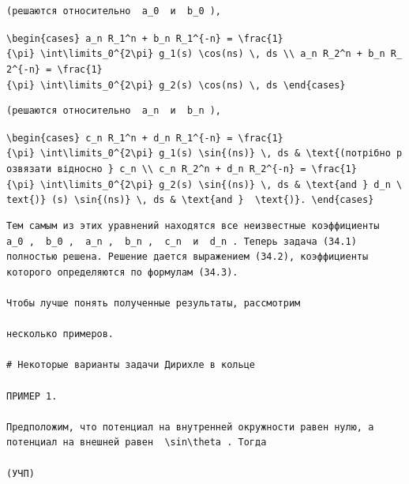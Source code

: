 \documentclass[
  ukrainian,
]{article}
\begin{document}
\begin{verbatim}
(решаются относительно  a_0  и  b_0 ),
\end{verbatim}

\texttt{\textbackslash{}begin\{cases\}\ a\_n\ R\_1\^{}n\ +\ b\_n\ R\_1\^{}\{-n\}\ =\ \textbackslash{}frac\{1\}\{\textbackslash{}pi\}\ \textbackslash{}int\textbackslash{}limits\_0\^{}\{2\textbackslash{}pi\}\ g\_1(s)\ \textbackslash{}cos(ns)\ \textbackslash{},\ ds\ \textbackslash{}\textbackslash{}\ a\_n\ R\_2\^{}n\ +\ b\_n\ R\_2\^{}\{-n\}\ =\ \textbackslash{}frac\{1\}\{\textbackslash{}pi\}\ \textbackslash{}int\textbackslash{}limits\_0\^{}\{2\textbackslash{}pi\}\ g\_2(s)\ \textbackslash{}cos(ns)\ \textbackslash{},\ ds\ \textbackslash{}end\{cases\}}

\begin{verbatim}
(решаются относительно  a_n  и  b_n ),
\end{verbatim}

\texttt{\textbackslash{}begin\{cases\}\ c\_n\ R\_1\^{}n\ +\ d\_n\ R\_1\^{}\{-n\}\ =\ \textbackslash{}frac\{1\}\{\textbackslash{}pi\}\ \textbackslash{}int\textbackslash{}limits\_0\^{}\{2\textbackslash{}pi\}\ g\_1(s)\ \textbackslash{}sin\{(ns)\}\ \textbackslash{},\ ds\ \&\ \textbackslash{}text\{(потрібно\ розв\textquotesingle{}язати\ відносно\ \}\ c\_n\ \textbackslash{}\textbackslash{}\ c\_n\ R\_2\^{}n\ +\ d\_n\ R\_2\^{}\{-n\}\ =\ \textbackslash{}frac\{1\}\{\textbackslash{}pi\}\ \textbackslash{}int\textbackslash{}limits\_0\^{}\{2\textbackslash{}pi\}\ g\_2(s)\ \textbackslash{}sin\{(ns)\}\ \textbackslash{},\ ds\ \&\ \textbackslash{}text\{and\ \}\ d\_n\ \textbackslash{}text\{)\}\ (s)\ \textbackslash{}sin\{(ns)\}\ \textbackslash{},\ ds\ \&\ \textbackslash{}text\{and\ \}\ \ \textbackslash{}text\{)\}.\ \textbackslash{}end\{cases\}}

\begin{verbatim}
Тем самым из этих уравнений находятся все неизвестные коэффициенты  a_0 ,  b_0 ,  a_n ,  b_n ,  c_n  и  d_n . Теперь задача (34.1) полностью решена. Решение дается выражением (34.2), коэффициенты которого определяются по формулам (34.3).

Чтобы лучше понять полученные результаты, рассмотрим

несколько примеров.

# Некоторые варианты задачи Дирихле в кольце

ПРИМЕР 1.

Предположим, что потенциал на внутренней окружности равен нулю, а потенциал на внешней равен  \sin\theta . Тогда

(УЧП)
\end{verbatim}
\end{document}
